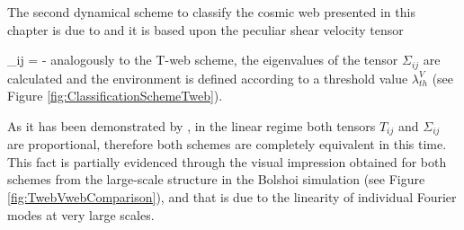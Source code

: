 The second dynamical scheme to classify the cosmic web presented in this 
chapter is due to \cite{hoffman2012} and it is based upon the peculiar 
shear velocity tensor


{ \Sigma_{ij} = - }
analogously to the T-web scheme, the eigenvalues of the tensor $\Sigma_{ij}$
are calculated and the environment is defined according to a threshold 
value $\lambda_{th}^V$ (see Figure \ref{fig:ClassificationSchemeTweb}).


As it has been demonstrated by \cite{hoffman2012}, in the linear regime 
both tensors $T_{ij}$ and $\Sigma_{ij}$ are proportional, therefore both
schemes are completely equivalent in this time. This fact is partially 
evidenced through the visual impression obtained for both schemes from
the large-scale structure in the Bolshoi simulation (see Figure
\ref{fig:TwebVwebComparison}), and that is due to the linearity of
individual Fourier modes at very large scales.


